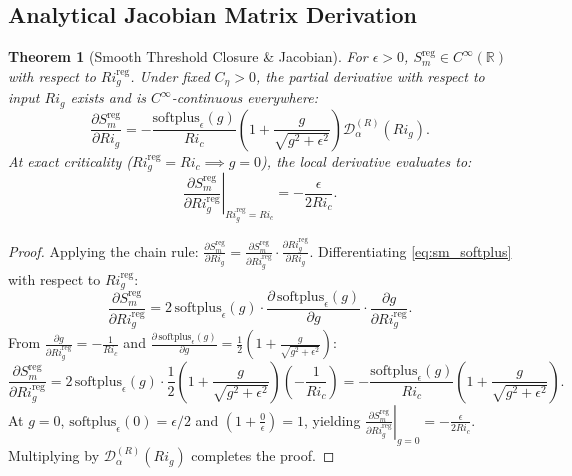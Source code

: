 \documentclass[11pt,a4paper]{article}
\newtheorem{theorem}{Theorem}
\begin{document}
\subsection{Analytical Jacobian Matrix Derivation}

\begin{theorem}[Smooth Threshold Closure \& Jacobian]
For $\epsilon > 0$, $S_m^{\text{reg}} \in C^\infty(\mathbb{R})$ with respect to $Ri_g^{\text{reg}}$. Under fixed $C_\eta > 0$, the partial derivative with respect to input $Ri_g$ exists and is $C^\infty$-continuous everywhere:
\begin{equation}
\frac{\partial S_m^{\text{reg}}}{\partial Ri_g} = -\frac{\text{softplus}_\epsilon(g)}{Ri_c} \left( 1 + \frac{g}{\sqrt{g^2 + \epsilon^2}} \right) \mathcal{D}_\alpha^{(R)}(Ri_g).
\label{eq:sm_jacobian}
\end{equation}
At exact criticality ($Ri_g^{\text{reg}} = Ri_c \implies g = 0$), the local derivative evaluates to:
\begin{equation}
\left. \frac{\partial S_m^{\text{reg}}}{\partial Ri_g^{\text{reg}}} \right|_{Ri_g^{\text{reg}}=Ri_c} = -\frac{\epsilon}{2 Ri_c}.
\end{equation}
\end{theorem}

\begin{proof}
Applying the chain rule: $\frac{\partial S_m^{\text{reg}}}{\partial Ri_g} = \frac{\partial S_m^{\text{reg}}}{\partial Ri_g^{\text{reg}}} \cdot \frac{\partial Ri_g^{\text{reg}}}{\partial Ri_g}$. Differentiating \cref{eq:sm_softplus} with respect to $Ri_g^{\text{reg}}$:
\begin{equation}
\frac{\partial S_m^{\text{reg}}}{\partial Ri_g^{\text{reg}}} = 2 \, \text{softplus}_\epsilon(g) \cdot \frac{\partial \, \text{softplus}_\epsilon(g)}{\partial g} \cdot \frac{\partial g}{\partial Ri_g^{\text{reg}}}.
\end{equation}
From $\frac{\partial g}{\partial Ri_g^{\text{reg}}} = -\frac{1}{Ri_c}$ and $\frac{\partial \, \text{softplus}_\epsilon(g)}{\partial g} = \frac{1}{2} \left( 1 + \frac{g}{\sqrt{g^2 + \epsilon^2}} \right)$:
\begin{equation}
\frac{\partial S_m^{\text{reg}}}{\partial Ri_g^{\text{reg}}} = 2 \, \text{softplus}_\epsilon(g) \cdot \frac{1}{2} \left( 1 + \frac{g}{\sqrt{g^2 + \epsilon^2}} \right) \left( -\frac{1}{Ri_c} \right) = -\frac{\text{softplus}_\epsilon(g)}{Ri_c} \left( 1 + \frac{g}{\sqrt{g^2 + \epsilon^2}} \right).
\end{equation}
At $g = 0$, $\text{softplus}_\epsilon(0) = \epsilon / 2$ and $\left(1 + \frac{0}{\epsilon}\right) = 1$, yielding $\left. \frac{\partial S_m^{\text{reg}}}{\partial Ri_g^{\text{reg}}} \right|_{g=0} = -\frac{\epsilon}{2 Ri_c}$. Multiplying by $\mathcal{D}_\alpha^{(R)}(Ri_g)$ completes the proof.
\end{proof}
\end{document}
